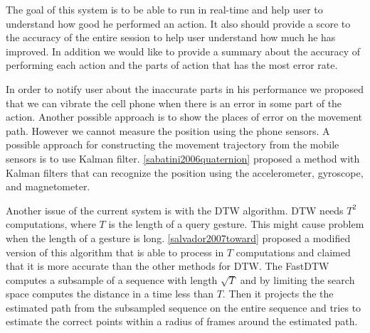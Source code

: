 The goal of this system is to be able to run in real-time and help user to understand how good he performed an action. It also should provide a score to the accuracy of the entire session to help user understand how much he has improved. In addition we would like to provide a summary about the accuracy of performing each action and the parts of action that has the most error rate.

In order to notify user about the inaccurate parts in his performance we proposed that we can vibrate the cell phone when there is an error in some part of the action. Another possible approach is to show the places of error on the movement path. However we cannot measure the position using the phone sensors. A possible approach for constructing the movement trajectory from the mobile sensors is to use Kalman filter. \ref{sabatini2006quaternion} proposed a method with Kalman filters that can recognize the position using the accelerometer, gyroscope, and magnetometer.

Another issue of the current system is with the DTW algorithm. DTW needs $T^2$ computations, where $T$ is the length of a query gesture. This might cause problem when the length of a gesture is long. \ref{salvador2007toward} proposed a modified version of this algorithm that is able to process in $T$ computations and claimed that it is more accurate than the other methods for DTW. The FastDTW computes a subsample of a sequence with length $\sqrt{T}$ and by limiting the search space computes the distance in a time less than $T$. Then it projects the the estimated path from the subsampled sequence on the entire sequence and tries to estimate the correct points within a radius of frames around the estimated path.



